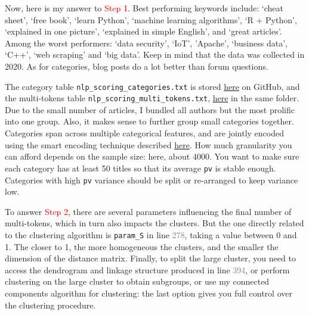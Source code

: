 \documentclass[oneside,10pt]{book}
\begin{document}
\noindent Now, here is my answer to \textcolor{red}{Step 1}. Best performing keywords include: `cheat sheet', `free book', `learn Python', `machine learning algorithms', `R + Python',
 `explained in one picture', `explained in simple English',  and `great articles'. Among the worst performers: 
`data security', `IoT', 'Apache', `business data', `C++', `web scraping' and `big data'. Keep in mind that the data was collected in 2020.
As for categories, blog posts do a lot better than forum questions. 

The category table \texttt{nlp\_scoring\_categories.txt} is stored \href{https://github.com/VincentGranville/Statistical-Optimization/blob/main/nlp_scoring_categories.txt}{here} 
on GitHub, and the multi-tokens table
 \texttt{nlp\_scoring\_multi\_tokens.txt}, 
\href{https://github.com/VincentGranville/Statistical-Optimization/blob/main/nlp_scoring_multi_tokens.txt}{here} in the same folder. Due to the small number
 of articles, I bundled all authors but the most prolific into one group. Also, it makes sense to further group small categories together.  
Categories span across multiple categorical features, and are jointly encoded using the 
\textcolor{index}{smart encoding} technique described \href{https://docs.google.com/presentation/d/1kDlAhS8yh_-Yu19ICxFk0Hxfq3ZXc4iy/}{here}. 
How much granularity you can afford depends on the sample size: here, about 4000. You want to make sure each category has at least 50 titles so
 that its average \texttt{pv} is stable enough.  Categories with high \texttt{pv} variance should be split or re-arranged to keep variance low.  

To answer \textcolor{red}{Step 2}, there are several parameters influencing the final number of multi-tokens, which in turn also impacts the clusters. But the one
directly related to the clustering algorithm is \texttt{param\_S} in line  \textcolor{gray}{278}, taking a value between 0 and 1. The closer to 1, the more
 homogeneous the clusters, and the smaller the dimension of the distance matrix. Finally, to split the large cluster, you need to access the 
\textcolor{index}{dendrogram} and linkage structure produced in line \textcolor{gray}{394}, or perform clustering on the large cluster to obtain subgroups, 
 or use my connected components algorithm for clustering: the last option gives you full control over the clustering procedure. 
\end{document}
